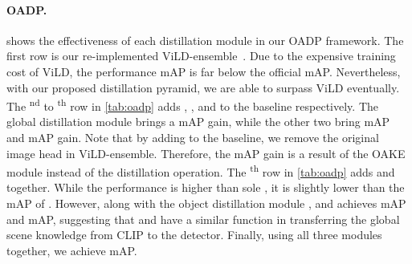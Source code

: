 \documentclass[10pt,twocolumn,letterpaper]{article}
\makeatletter
\newcommand{\@mAP}[2]{mAP}
\newcommand{\mAPN}[1]{\@mAP{N}{#1}}
\makeatother
\begin{document}
\paragraph{OADP.}  shows the effectiveness of each distillation module in our OADP framework.
The first row is our re-implemented ViLD-ensemble~\cite{vild}.
Due to the expensive training cost of ViLD, the performance  \mAPN{50} is far below the official  \mAPN{50}.
Nevertheless, with our proposed distillation pyramid, we are able to surpass ViLD eventually.
The \textsuperscript{nd} to \textsuperscript{th} row in \cref{tab:oadp} adds , , and  to the baseline respectively.
The global distillation module brings a  \mAPN{50} gain, while the other two bring  \mAPN{50} and  \mAPN{50} gain.
Note that by adding  to the baseline, we remove the original image head in ViLD-ensemble.
Therefore, the  \mAPN{50} gain is a result of the OAKE module instead of the distillation operation.
The \textsuperscript{th} row in \cref{tab:oadp} adds  and  together.
While the  performance is higher than sole , it is slightly lower than the  \mAPN{50} of .
However, along with the object distillation module ,  and  achieves  \mAPN{50} and  \mAPN{50}, suggesting that  and  have a similar function in transferring the global scene knowledge from CLIP to the detector.
Finally, using all three modules together, we achieve  \mAPN{50}.

\begin{table}[t]
  \centering
  \caption{
    Ablation study of OAKE module.
``ViLD*'' indicates our re-implementation of multi-scale region embedding.
    ``MBS'', ``Fixed'', and ``Adaptive'' are three transforming strategies.
}
  \label{tab:token}
\end{table}
 
\end{document}
